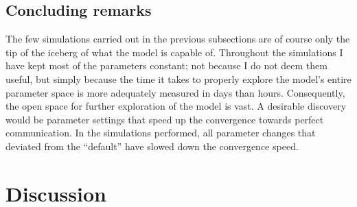 \documentclass[
	DIV=calc,
	BCOR=0mm,
	pagesize,
]{scrartcl}
\begin{document}
\subsection{Concluding remarks}
\label{ssec:rescon}
The few simulations carried out in the previous subsections are of course only the tip of the iceberg of what the model is capable of.
Throughout the simulations I have kept most of the parameters constant; not because I do not deem them useful, but simply because the time it takes to properly explore the model's entire parameter space is more adequately measured in days than hours.
Consequently, the open space for further exploration of the model is vast.
A desirable discovery would be parameter settings that speed up the convergence towards perfect communication.
In the simulations performed, all parameter changes that deviated from the ``default'' have slowed down the convergence speed.

\section{Discussion}
\label{sec:dis}

\citep{wilensky_netlogo_1999}
\newpage%
\end{document}
